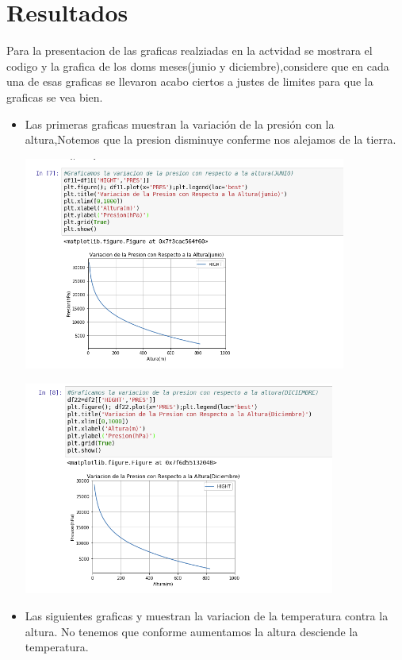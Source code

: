 \documentclass{article}
\begin{document}
 
 \section{Resultados}
 Para la presentacion de las graficas realziadas en la actvidad se mostrara el codigo y la grafica de los doms meses(junio y diciembre),considere que en cada una de esas graficas se llevaron acabo ciertos a justes de limites para que la graficas se vea bien.

\begin{itemize}
\item
 Las primeras graficas muestran la variación de la presión con la altura,Notemos que la presion disminuye conferme nos alejamos de la tierra.
 
 
 \begin{center}
\includegraphics[height=7cm]{3_6.png}
\end{center}


\begin{center}
\includegraphics[height=7cm]{3_7.png}
\end{center}
 
 
 \item
 Las siguientes graficas y muestran la variacion de la temperatura contra la altura.
 No tenemos que conforme aumentamos la altura desciende la temperatura.
 

\end{itemize}
\end{document}
